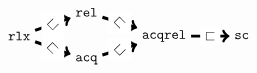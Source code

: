  \[\inarr{
 \begin{tikzpicture}[yscale=0.6,xscale=1.3]

   \node (rlx)    at (-1.3,  0)  {$\rlx$};
   \node (rel)    at (0   ,  1)  {$\rel$};
   \node (acq)    at (0   , -1)  {$\acq$};
   \node (acqrel) at (1.5 ,  0)  {$\acqrel$};
   \node (sc)     at (3   ,  0)  {$\sco$};

   \path[->] (rlx) edge[line width=0.742mm] 
                   node[fill=white,anchor=center,pos=0.5] 
                   {\rotatebox[origin=c]{45} {$\squ$}} 
             (rel); 

   \path[->] (rlx) edge[line width=0.742mm] 
                   node[fill=white,anchor=center,pos=0.5] 
                   {\rotatebox[origin=c]{-45} {$\squ$}}
             (acq); 
   
   \path[->] (rel) edge[line width=0.742mm] 
                   node[fill=white,anchor=center,pos=0.5] 
                   {\rotatebox[origin=c]{-45} {$\squ$}}
             (acqrel); 

   \path[->] (acq) edge[line width=0.742mm] 
                   node[fill=white,anchor=center,pos=0.5] 
                   {\rotatebox[origin=c]{45} {$\squ$}}
             (acqrel); 

   \path[->] (acqrel) edge[line width=0.742mm] 
                      node[fill=white, anchor=center, pos=0.5] {$\squ$} 
             (sc);

 \end{tikzpicture}
 }\]
